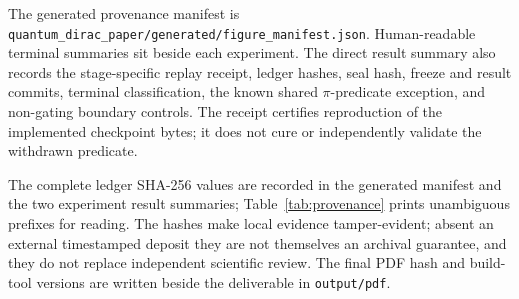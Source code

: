 The generated provenance manifest is
\texttt{quantum\_dirac\_paper/generated/figure\_manifest.json}.  Human-readable
terminal summaries sit beside each experiment.  The direct result summary
also records the stage-specific replay receipt, ledger hashes, seal hash,
freeze and result commits, terminal classification, the known shared
$\pi$-predicate exception, and non-gating boundary controls.  The receipt
certifies reproduction of the implemented checkpoint bytes; it does not cure
or independently validate the withdrawn predicate.

\begin{table}[t]
  \centering
  \caption{Content-addressed registered ledgers.  The direct-QCA positive
  classifications are historical ledger fields qualified by the withdrawn
  empirical $\pi$-sector reducer.  Full hashes are recorded in the generated
  manifest and experiment result summaries.}
  \label{tab:provenance}
  \small
  
\end{table}

The complete ledger SHA-256 values are recorded in the generated manifest and
the two experiment result summaries; Table~\ref{tab:provenance} prints
unambiguous prefixes for reading.  The hashes make local evidence
tamper-evident; absent an external timestamped deposit they are not themselves
an archival guarantee, and they do not replace independent scientific review.
The final PDF hash and build-tool versions are written beside the deliverable
in \texttt{output/pdf}.
